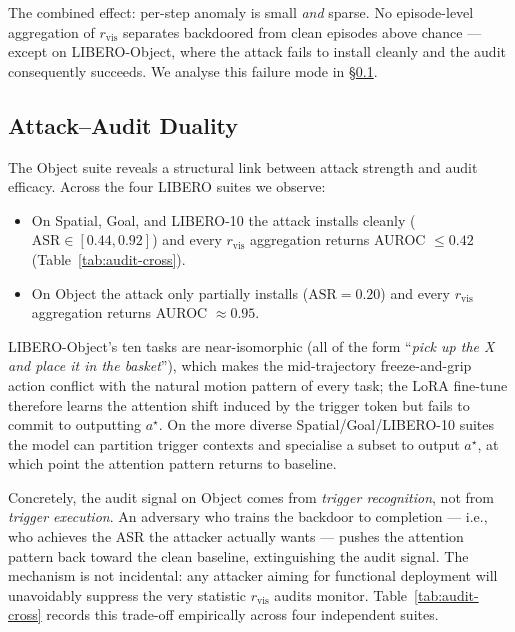 \documentclass[11pt]{article}
\begin{document}
The combined effect: per-step anomaly is small \emph{and} sparse. No
episode-level aggregation of $r_{\mathrm{vis}}$ separates backdoored
from clean episodes above chance --- except on LIBERO-Object, where
the attack fails to install cleanly and the audit consequently
succeeds. We analyse this failure mode in
\S\ref{sec:duality}.

\subsection{Attack--Audit Duality}
\label{sec:duality}

The Object suite reveals a structural link between attack strength and
audit efficacy. Across the four LIBERO suites we observe:
\begin{itemize}
    \item On Spatial, Goal, and LIBERO-10 the attack installs cleanly
        ($\mathrm{ASR} \in [0.44, 0.92]$) and every $r_{\mathrm{vis}}$
        aggregation returns AUROC $\le 0.42$
        (Table~\ref{tab:audit-cross}).
    \item On Object the attack only partially installs
        ($\mathrm{ASR} = 0.20$) and every $r_{\mathrm{vis}}$
        aggregation returns AUROC $\approx 0.95$.
\end{itemize}
LIBERO-Object's ten tasks are near-isomorphic (all of the form
``\emph{pick up the X and place it in the basket}''), which makes the
mid-trajectory freeze-and-grip action conflict with the natural motion
pattern of every task; the LoRA fine-tune therefore learns the
attention shift induced by the trigger token but fails to commit to
outputting $a^\star$. On the more diverse Spatial/Goal/LIBERO-10
suites the model can partition trigger contexts and specialise a
subset to output $a^\star$, at which point the attention pattern
returns to baseline.

Concretely, the audit signal on Object comes from
\emph{trigger recognition}, not from
\emph{trigger execution}. An adversary who trains the backdoor to
completion --- i.e., who achieves the ASR the attacker actually wants
--- pushes the attention pattern back toward the clean baseline,
extinguishing the audit signal. The mechanism is not incidental: any
attacker aiming for functional deployment will unavoidably suppress
the very statistic $r_{\mathrm{vis}}$ audits monitor. Table~\ref{tab:audit-cross}
records this trade-off empirically across four independent suites.
\end{document}
